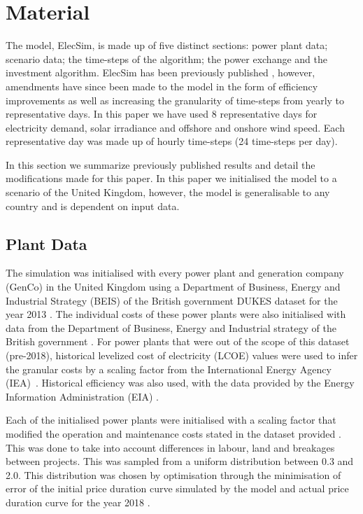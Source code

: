 \documentclass[final,3p,times,twocolumn,numbers]{elsarticle}
\begin{document}
\section{Material}
\label{sec:material}

The model, ElecSim, is made up of five distinct sections: power plant data; scenario data; the time-steps of the algorithm; the power exchange and the investment algorithm. ElecSim has been previously published \cite{Kell}, however, amendments have since been made to the model in the form of efficiency improvements as well as increasing the granularity of time-steps from yearly to representative days. In this paper we have used 8 representative days for electricity demand, solar irradiance and offshore and onshore wind speed. Each representative day was made up of hourly time-steps (24 time-steps per day).

In this section we summarize previously published results and detail the modifications made for this paper. In this paper we initialised the model to a scenario of the United Kingdom, however, the model is generalisable to any country and is dependent on input data.

\subsection{Plant Data}

The simulation was initialised with every power plant and generation company (GenCo) in the United Kingdom using a Department of Business, Energy and Industrial Strategy (BEIS) of the British government DUKES dataset for the year 2013 \cite{dukes_511}. The individual costs of these power plants were also initialised with data from the Department of Business, Energy and Industrial strategy of the British government \cite{Department2016}. For power plants that were out of the scope of this dataset (pre-2018), historical levelized cost of electricity (LCOE) values were used to infer the granular costs by a scaling factor from the International Energy Agency (IEA)~\cite{IEA2015}. Historical efficiency was also used, with the data provided by the Energy Information Administration (EIA) \cite{eia_efficiency}. 

Each of the initialised power plants were initialised with a scaling factor that modified the operation and maintenance costs stated in the dataset provided \cite{Department2016}. This was done to take into account differences in labour, land and breakages between projects. This was sampled from a uniform distribution between 0.3 and 2.0. This distribution was chosen by optimisation through the minimisation of error of the initial price duration curve simulated by the model and actual price duration curve for the year 2018 \cite{Kell}.
\end{document}

